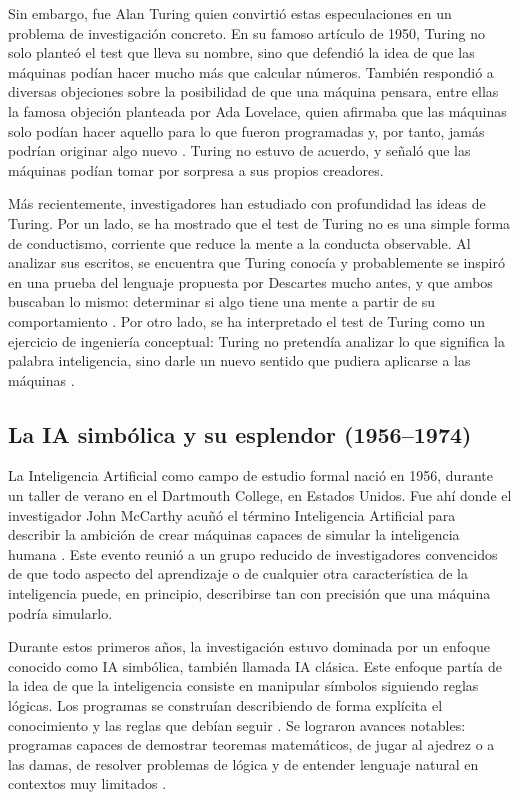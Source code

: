 \documentclass[11pt]{article}
\begin{document}
Sin embargo, fue Alan Turing quien convirtió estas especulaciones en un problema de investigación concreto. En su famoso artículo de 1950, Turing no solo planteó el test que lleva su nombre, sino que defendió la idea de que las máquinas podían hacer mucho más que calcular números. También respondió a diversas objeciones sobre la posibilidad de que una máquina pensara, entre ellas la famosa objeción planteada por Ada Lovelace, quien afirmaba que las máquinas solo podían hacer aquello para lo que fueron programadas y, por tanto, jamás podrían originar algo nuevo \parencite{grosz_what_2012}. Turing no estuvo de acuerdo, y señaló que las máquinas podían tomar por sorpresa a sus propios creadores.

Más recientemente, investigadores han estudiado con profundidad las ideas de Turing. Por un lado, se ha mostrado que el test de Turing no es una simple forma de conductismo, corriente que reduce la mente a la conducta observable. Al analizar sus escritos, se encuentra que Turing conocía y probablemente se inspiró en una prueba del lenguaje propuesta por Descartes mucho antes, y que ambos buscaban lo mismo: determinar si algo tiene una mente a partir de su comportamiento \parencite{abramson_descartes_2011}. Por otro lado, se ha interpretado el test de Turing como un ejercicio de ingeniería conceptual: Turing no pretendía analizar lo que significa la palabra inteligencia, sino darle un nuevo sentido que pudiera aplicarse a las máquinas \parencite{milkowski_turings_2022}.

\subsection{La IA simbólica y su esplendor (1956--1974)}

La Inteligencia Artificial como campo de estudio formal nació en 1956, durante un taller de verano en el Dartmouth College, en Estados Unidos. Fue ahí donde el investigador John McCarthy acuñó el término Inteligencia Artificial para describir la ambición de crear máquinas capaces de simular la inteligencia humana \parencite{haenlein_brief_2019}. Este evento reunió a un grupo reducido de investigadores convencidos de que todo aspecto del aprendizaje o de cualquier otra característica de la inteligencia puede, en principio, describirse tan con precisión que una máquina podría simularlo.

Durante estos primeros años, la investigación estuvo dominada por un enfoque conocido como IA simbólica, también llamada IA clásica. Este enfoque partía de la idea de que la inteligencia consiste en manipular símbolos siguiendo reglas lógicas. Los programas se construían describiendo de forma explícita el conocimiento y las reglas que debían seguir \parencite{buchanan_very_2005}. Se lograron avances notables: programas capaces de demostrar teoremas matemáticos, de jugar al ajedrez o a las damas, de resolver problemas de lógica y de entender lenguaje natural en contextos muy limitados \parencite{buchanan_very_2005}.
\end{document}
